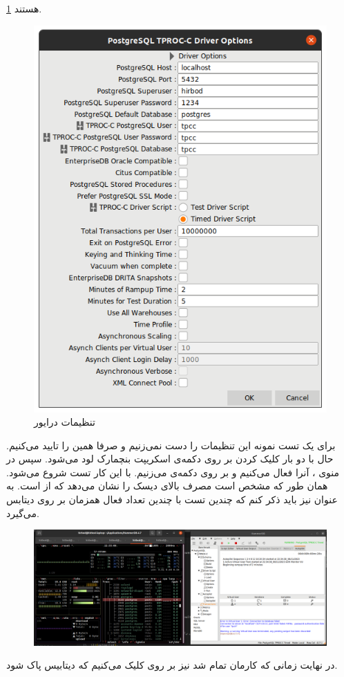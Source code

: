 \ref{fig:hammerdb:init:default_driver}
هستند.
\begin{figure}[H]
    \centering
    \includegraphics[scale=1]{pictures/hammerdb/default-driver.png}
    \caption{تنظیمات درایور}
    \label{fig:hammerdb:init:default_driver}
\end{figure}
برای یک تست نمونه این تنظیمات را دست نمی‌زنیم و صرفا همین را تایید می‌کنیم. حال با دو بار کلیک کردن بر روی دکمه‌ی
اسکریپت بنچمارک لود می‌شود. سپس در منوی
،
آنرا فعال می‌کنیم و بر روی دکمه‌ی
می‌زنیم. با این کار تست شروع می‌شود. همان طور که مشخص است
مصرف بالای دیسک را نشان می‌دهد که از
است. به عنوان
نیز باید ذکر کنم که
چندین تست با چندین تعداد فعال همزمان بر روی دیتابس می‌گیرد.

\begin{figure}[H]
    \centering
    \includegraphics[scale=1]{pictures/hammerdb/sample-run.png}
    \caption{}
\end{figure}

در نهایت زمانی که کارمان تمام شد نیز بر روی
کلیک می‌کنیم که دیتابیس پاک شود.